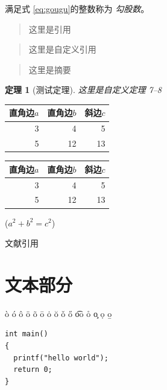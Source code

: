 \documentclass[UTF8]{ctexart}
\newtheorem{thm}{定理}
\newenvironment{myquote}
  {\begin{quote} \kaishu \zihao{-5}}
  {\end{quote}}
\begin{document}
满足式 \eqref{eq:gougu}的整数称为 \emph{勾股数}。

\begin{quote}
   \kaishu 这里是引用
\end{quote}

\begin{myquote}
  这里是自定义引用
\end{myquote}

\begin{abstract}
  这里是摘要
\end{abstract}

\begin{thm}[测试定理]
  这里是自定义定理
    7--8
\end{thm}

\begin{tabular}{|rrr|}
\hline
    直角边$a$ & 直角边$b$ & 斜边$c$ \\
\hline
    3 &  4 &  5 \\
    5 &  12 & 13 \\
\hline
\end{tabular}

\begin{table}[H]
  \begin{tabular}{|rrr|}
    \hline
        直角边$a$ & 直角边$b$ & 斜边$c$ \\
    \hline
        3 &  4 &  5 \\
        5 &  12 & 13 \\
    \hline
  \end{tabular}
  \qquad ($a^2 + b^2 = c^2$)
\end{table}

文献引用 \cite{Kline}

\nocite{Shiye}


\section{文本部分}
\`o \'o \^o \"o
\~o \=o \.o \u{o}
\v{o} \H{o} \t{oo} \r{o}
\c{o} \d{o} \b{o}

\begin{verbatim}
int main()
{
  printf("hello world");
  return 0;
}
\end{verbatim}
\end{document}
